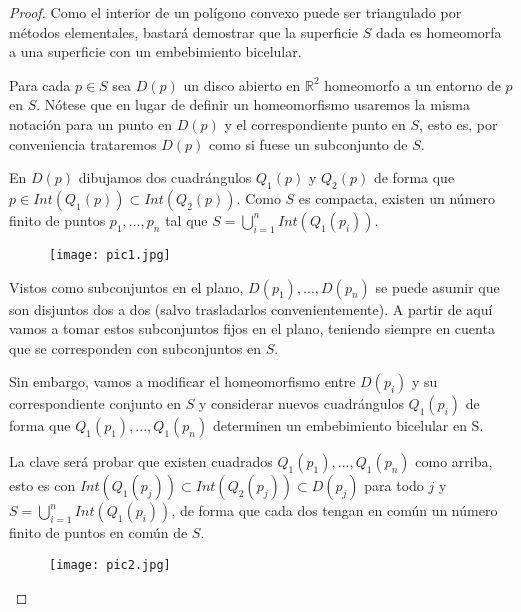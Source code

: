 \documentclass[12pt,a4paper,oldfontcommands]{memoir}
\begin{document}
\begin{proof}

	Como el interior de un polígono convexo puede ser triangulado por métodos elementales, bastará demostrar que la superficie $S$ dada es homeomorfa a una superficie con un embebimiento bicelular.

	Para cada $p \in S$ sea $D(p)$ un disco abierto en $\mathbb{R}^2$ homeomorfo a un entorno de $p$ en $S$. Nótese que en lugar de definir un homeomorfismo usaremos la misma notación para un punto en $D(p)$ y el correspondiente punto en $S$, esto es,  por conveniencia trataremos $D(p)$ como si fuese un subconjunto de $S$.

	En $D(p)$ dibujamos dos cuadrángulos $Q_{1}(p)$ y $Q_{2}(p)$ de forma que $p \in Int(Q_{1}(p)) \subset Int(Q_{2}(p))$. Como $S$ es  compacta, existen un número finito de puntos $p_{1},...,p_{n}$ tal que $S = \bigcup_{i = 1}^{n} Int(Q_{1}(p_{i}))$.

\begin{figure}[h]
\centering
\begin{minipage}[c]{\textwidth}
\centering
    \texttt{[image: pic1.jpg]}
\end{minipage}
\end{figure}

	Vistos como subconjuntos en el plano, $D(p_{1}),...,D(p_{n})$ se puede asumir que son disjuntos dos a dos (salvo trasladarlos convenientemente). A partir de aquí vamos a tomar estos subconjuntos fijos en el plano, teniendo siempre en cuenta que se corresponden con subconjuntos en $S$.

	Sin embargo, vamos a modificar el homeomorfismo entre $D(p_i)$ y su correspondiente conjunto en $S$ y considerar nuevos cuadrángulos $Q_{1}(p_i)$ de forma que $Q_{1}(p_{1}),...,Q_{1}(p_{n})$  determinen un embebimiento bicelular en S.

La clave será probar que existen cuadrados  $Q_{1}(p_{1}),...,Q_{1}(p_{n})$  como arriba, esto es con $Int(Q_{1}(p_j)) \subset Int(Q_{2}(p_j))\subset D(p_j)$ para todo $j$ y $S = \bigcup_{i = 1}^{n} Int(Q_{1}(p_{i}))$, de forma que  cada dos   tengan en común un número finito de puntos en común de $S$. 

\begin{figure}[h]
\centering
\begin{minipage}[c]{\textwidth}
\centering
    \texttt{[image: pic2.jpg]}
\end{minipage}
\end{figure}


\end{proof}
\end{document}
